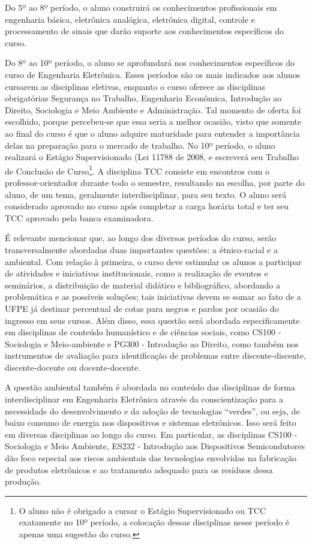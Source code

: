 Do 5º ao 8º período, o aluno construirá os conhecimentos profissionais em engenharia básica, eletrônica analógica, eletrônica digital, controle e processamento de sinais que darão suporte aos conhecimentos específicos do curso. 

Do 8º ao 10º período, o aluno se aprofundará nos conhecimentos específicos do curso de Engenharia Eletrônica. Esses períodos são os mais indicados aos alunos cursarem as disciplinas eletivas, enquanto o curso oferece as disciplinas obrigatórias Segurança no Trabalho, Engenharia Econômica, Introdução ao Direito, Sociologia e Meio Ambiente e Administração. Tal momento de oferta foi escolhido, porque percebeu-se que essa seria a melhor ocasião, visto que somente ao final do curso é que o aluno adquire maturidade para entender a importância delas na preparação para o mercado de trabalho. No 10º período, o aluno realizará o Estágio Supervisionado (Lei 11788 de 2008, e escreverá seu Trabalho de Conclusão de Curso\footnote[7]{O aluno não é obrigado a cursar o Estágio Supervisionado ou TCC exatamente no 10º período, a colocação dessas disciplinas nesse período é apenas uma sugestão do curso.}. A disciplina TCC consiste em encontros com o professor-orientador durante todo o semestre, resultando na escolha, por parte do aluno, de um tema, geralmente interdisciplinar, para seu texto. O aluno será considerado aprovado no curso após completar a carga horária total e ter seu TCC aprovado pela banca examinadora.

É relevante mencionar que, ao longo dos diversos períodos do curso, serão transversalmente abordadas duas importantes questões: a étnico-racial e a ambiental. Com relação à primeira, o curso deve estimular os alunos a participar de atividades e iniciativas institucionais, como a realização de eventos e seminários, a distribuição de material didático e bibliográfico, abordando a problemática e as possíveis soluções; tais iniciativas devem se somar ao fato de a UFPE já destinar percentual de cotas para negros e pardos por ocasião do ingresso em seus cursos. Além disso, essa questão será abordada especificamente em disciplinas de conteúdo humanístico e de ciências sociais, como CS100 - Sociologia e Meio-ambiente e PG300 - Introdução ao Direito, como também nos instrumentos de avaliação para identificação de problemas entre discente-discente, discente-docente ou docente-docente.

A questão ambiental também é abordada no conteúdo das disciplinas de forma interdisciplinar em Engenharia Eletrônica através da conscientização para a necessidade do desenvolvimento e da adoção de tecnologias “verdes”, ou seja, de baixo consumo de energia nos dispositivos e sistemas eletrônicos. Isso será feito em diversas disciplinas ao longo do curso. Em particular, as disciplinas CS100 - Sociologia e Meio Ambiente, ES232 - Introdução aos Dispositivos Semicondutores dão foco especial aos riscos ambientais das tecnologias envolvidas na fabricação de produtos eletrônicos e ao tratamento adequado para os resíduos dessa produção.

